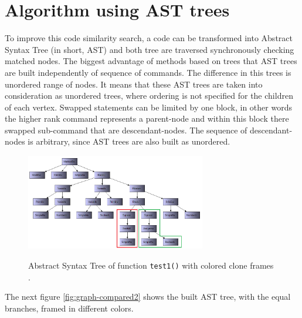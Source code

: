 \documentclass{report}
\begin{document}
\section{Algorithm using AST trees}
To improve this code similarity search, a code can be transformed into Abstract Syntax Tree (in short, AST) and both tree are traversed synchronously checking matched nodes. The biggest advantage of methods based on trees that AST trees are built independently of sequence of commands. The difference in this trees is unordered range of nodes. It means that these AST trees are taken into consideration as unordered trees, where ordering is not specified for the children of each vertex. Swapped statements can be limited by one block, in other words the higher rank command represents a parent-node and within this block there swapped sub-command that are 
descendant-nodes. The sequence of descendant-nodes is arbitrary, since AST trees are also built as unordered.\\
\begin{figure}[h]
  \centering
  \includegraphics[width=0.70\textwidth, scale = 0.75]{Figures/text-to-text/graph-compared1.png}\\[0.1cm]
  \caption[Abstract Syntax Tree with colored clone frames]{Abstract Syntax Tree of function \texttt{test1()} with colored clone frames .}
  \label{fig:graph-compared1}
\end{figure}

The next figure \ref{fig:graph-compared2} shows the built AST tree, with the equal branches, framed in different colors.
\end{document}
